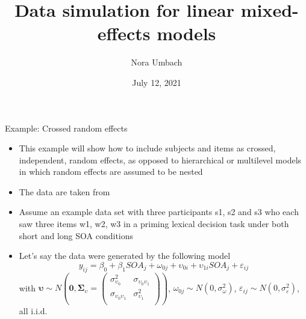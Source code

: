 \documentclass{beamer}
\title{Data simulation for linear mixed-effects models}
\author{Nora Umbach%
}
\date{July 12, 2021}
\newcommand{\gvect}[1]{\boldsymbol{#1}}
\newcommand{\gmat}[1]{\boldsymbol{#1}}
\begin{document}
\begin{frame}{}
\thispagestyle{empty}
\titlepage
\end{frame}



\begin{frame}{Example: Crossed random effects}
  \begin{itemize}
    \item This example will show how to include subjects and items as
      crossed, independent, random effects, as opposed to hierarchical or
      multilevel models in which random effects are assumed to be nested
    \item The data are taken from \citet{Baayen2008}
    \item Assume an example data set with three participants s1, s2 and s3
      who each saw three items w1, w2, w3 in a priming lexical decision
      task under both short and long SOA conditions
    \item Let's say the data were generated by the following model
  \[
    y_{ij} = \beta_0 + \beta_1 SOA_j + \omega_{0j} + \upsilon_{0i} +
      \upsilon_{1i} SOA_j + \varepsilon_{ij} 
  \]
\small
with $\gvect{\upsilon} \sim N\left(\gvect{0}, \gmat{\Sigma}_{\upsilon} = 
    \begin{pmatrix}
      \sigma^2_{\upsilon_0} & \sigma_{\upsilon_0\upsilon_1} \\
      \sigma_{\upsilon_0\upsilon_1} & \sigma^2_{\upsilon_1} \\
    \end{pmatrix}\right)$,
      $\omega_{0j} \sim N(0, \sigma_{\omega}^2)$, $\varepsilon_{ij} \sim N(0,
  \sigma_{\varepsilon}^2)$, all i.i.d. 
  \end{itemize}
\end{frame}
\end{document}
